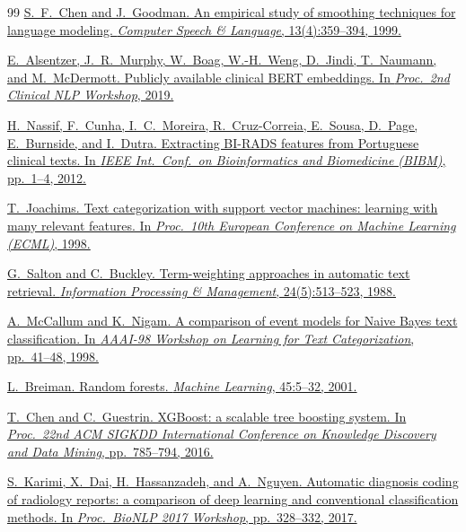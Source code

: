 \documentclass[11pt,a4paper]{article}
\begin{document}
\begin{thebibliography}{99}
\href{https://doi.org/10.1006/csla.1999.0128}{%
S.~F.~Chen and J.~Goodman.
An empirical study of smoothing techniques for language modeling.
\textit{Computer Speech \& Language}, 13(4):359--394, 1999.}

\href{https://aclanthology.org/W19-1909/}{%
E.~Alsentzer, J.~R.~Murphy, W.~Boag, W.-H.~Weng, D.~Jindi, T.~Naumann, and M.~McDermott.
Publicly available clinical BERT embeddings.
In \textit{Proc.\ 2nd Clinical NLP Workshop}, 2019.}

\href{https://pmc.ncbi.nlm.nih.gov/articles/PMC3688645}{%
H.~Nassif, F.~Cunha, I.~C.~Moreira, R.~Cruz-Correia, E.~Sousa, D.~Page, E.~Burnside, and I.~Dutra.
Extracting BI-RADS features from Portuguese clinical texts.
In \textit{IEEE Int.\ Conf.\ on Bioinformatics and Biomedicine (BIBM)}, pp.~1--4, 2012.}

\href{https://link.springer.com/chapter/10.1007/BFb0026683}{%
T.~Joachims.
Text categorization with support vector machines: learning with many relevant features.
In \textit{Proc.\ 10th European Conference on Machine Learning (ECML)}, 1998.}

\href{https://doi.org/10.1016/0306-4573(88)90021-0}{%
G.~Salton and C.~Buckley.
Term-weighting approaches in automatic text retrieval.
\textit{Information Processing \& Management}, 24(5):513--523, 1988.}

\href{https://www.cs.cmu.edu/~knigam/papers/multinomial-aaaiws98.pdf}{%
A.~McCallum and K.~Nigam.
A comparison of event models for Naive Bayes text classification.
In \textit{AAAI-98 Workshop on Learning for Text Categorization}, pp.~41--48, 1998.}

\href{https://doi.org/10.1023/A:1010933404324}{%
L.~Breiman.
Random forests.
\textit{Machine Learning}, 45:5--32, 2001.}

\href{https://doi.org/10.1145/2939672.2939785}{%
T.~Chen and C.~Guestrin.
XGBoost: a scalable tree boosting system.
In \textit{Proc.\ 22nd ACM SIGKDD International Conference on Knowledge Discovery and Data Mining},
pp.~785--794, 2016.}

\href{https://aclanthology.org/W17-2342/}{%
S.~Karimi, X.~Dai, H.~Hassanzadeh, and A.~Nguyen.
Automatic diagnosis coding of radiology reports: a comparison of deep learning and conventional classification methods.
In \textit{Proc.\ BioNLP 2017 Workshop}, pp.~328--332, 2017.}


\end{thebibliography}
\end{document}
